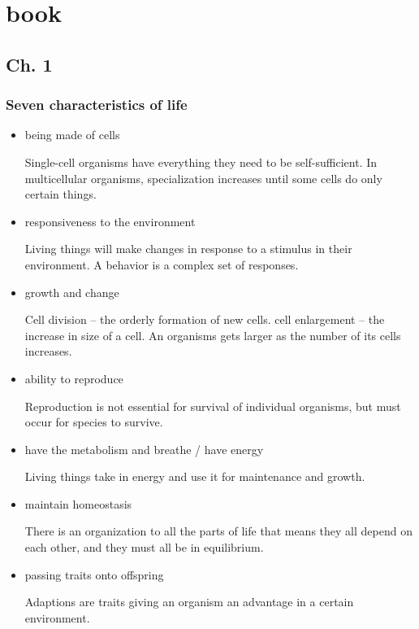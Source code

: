 \documentclass[11pt]{article}
\begin{document}
\section{book}
\label{sec:org5d99041}
\subsection{Ch. 1}
\label{sec:orgb0178b0}
\subsubsection{Seven characteristics of life}
\label{sec:orge9955b2}
\begin{itemize}
\item being made of cells

Single-cell organisms have everything they need to be self-sufficient. In
multicellular organisms, specialization increases until some cells do only
certain things.

\item responsiveness to the environment

Living things will make changes in response to a stimulus in their
environment. A behavior is a complex set of responses.

\item growth and change

Cell division -- the orderly formation of new cells. cell enlargement --
the increase in size of a cell. An organisms gets larger as the number of
its cells increases.

\item ability to reproduce

Reproduction is not essential for survival of individual organisms, but
must occur for species to survive.

\item have the metabolism and breathe / have energy

Living things take in energy and use it for maintenance and growth.

\item maintain homeostasis

There is an organization to all the parts of life that means they all
depend on each other, and they must all be in equilibrium.

\item passing traits onto offspring

Adaptions are traits giving an organism an advantage in a certain
environment.
\end{itemize}
\end{document}

